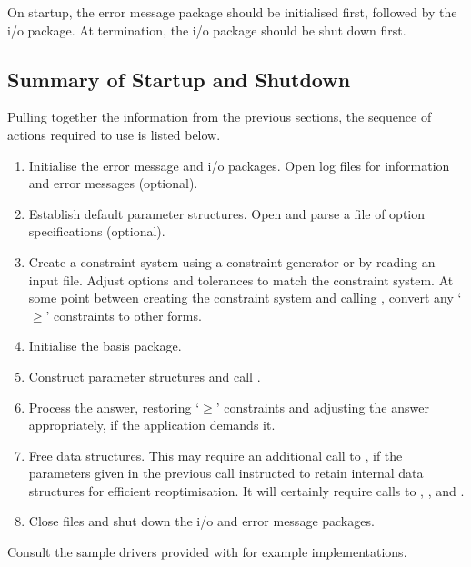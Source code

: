 On startup, the error message package should be initialised first, followed by
the i/o package.
At termination, the i/o package should be shut down first.

\subsection{Summary of \dylp Startup and Shutdown}
\label{sec:StartUpShutdownSummary}

Pulling together the information from the previous sections, the sequence of
actions required to use \dylp is listed below.
\begin{enumerate}
  \item
  Initialise the error message and i/o packages.
  Open log files for information and error messages (optional).

  \item
  Establish default parameter structures.
  Open and parse a file of \dylp option specifications (optional).

  \item
  Create a constraint system using a constraint generator or by reading an
  input file.
  Adjust options and tolerances to match the constraint system.
  At some point between creating the constraint system and calling
  , convert any `$\geq$' constraints to other forms.

  \item
  Initialise the basis package.

  \item
  Construct parameter structures and call .

  \item
  Process the answer, restoring `$\geq$' constraints and adjusting the answer
  appropriately, if the application demands it.

  \item
  Free data structures.
  This may require an additional call to , if the parameters
  given in the previous call instructed \dylp to retain internal data
  structures for efficient reoptimisation.
  It will certainly require calls to ,
  , and .

  \item
  Close files and shut down the i/o and error message packages.
\end{enumerate}
Consult the sample drivers provided with \dylp for example implementations.

